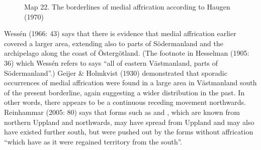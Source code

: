 \begin{figure}[h]
\centering
\begin{minipage}{4.46319in}
\label{bkm:Ref130034367}Map 22. The borderlines of medial affrication according to Haugen (1970)
\end{minipage}
\end{figure}
Wessén (1966: 43) says that there is evidence that medial affrication earlier covered a larger area, extending also to parts of Södermanland and the archipelago along the coast of Östergötland. (The footnote in Hesselman (1905: 36) which Wessén refers to says “all of eastern Västmanland, parts of Södermanland”.) Geijer \& Holmkvist (1930) demonstrated that sporadic occurrences of medial affrication were found in a large area in Västmanland south of the present borderline, again suggesting a wider distribution in the past. In other words, there appears to be a continuous receding movement northwards. Reinhammar (2005: 80) says that forms such as  and , which are known from northern Uppland and northwards, may have spread from Uppland and may also have existed further south, but were pushed out by the forms without affrication “which have as it were regained territory from the south”.

